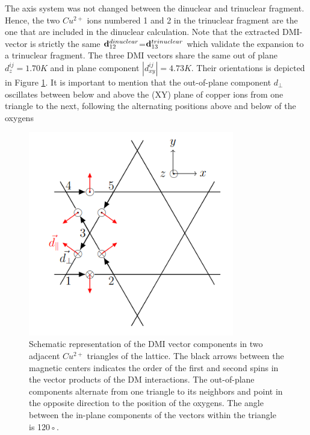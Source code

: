 \documentclass[12pt]{report}
\numberwithin{equation}{section}
\begin{document}
The axis system was not changed between the dinuclear and trinuclear fragment. 
Hence, the two $Cu^{2+}$ ions numbered 1 and 2 in the trinuclear fragment are the one that are included in the dinuclear calculation.
Note that the extracted DMI-vector is strictly the same $\vb{d}_{12}^{dinuclear}$=$\vb{d}_{13}^{trinuclear}$ which validate the expansion to a trinuclear fragment.
The three DMI vectors share the same out of plane $d_z^{ij}=1.70K$ and in plane component $|d_{xy}^{ij}|=4.73K$.
Their orientations is depicted in Figure \ref{fig:schemaDMI}.
It is important to mention that the out-of-plane component $d_{\perp}$ oscillates between below and above the (XY) plane of copper ions from one triangle to the next, following the alternating positions above and below of the oxygens
\begin{figure}[!ht]
    \centering
    \includegraphics[width=0.8\textwidth]{Images/SchemaDMI.png}
    \caption[Schematic representation of the DMI vector components in two adjacent $Cu^{2+}$ triangles of the lattice.]{Schematic representation of the DMI vector components in two adjacent $Cu^{2+}$ triangles of the lattice. The black arrows
    between the magnetic centers indicates the order of the first and second spins in the
    vector products of the DM interactions. The out-of-plane components alternate from
    one triangle to its neighbors and point in the opposite direction to the position of
    the oxygens. The angle between the in-plane components of the vectors within the
    triangle is 120◦. }
    \label{fig:schemaDMI}
\end{figure}
\end{document}
